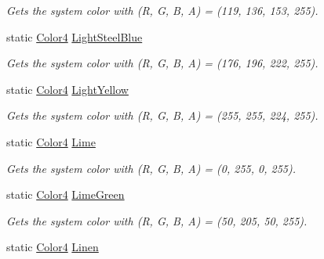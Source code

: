 \begin{DoxyCompactItemize}
\begin{DoxyCompactList}\small\item\em Gets the system color with (R, G, B, A) = (119, 136, 153, 255). \end{DoxyCompactList}\item 
static \hyperlink{struct_open_t_k_1_1_graphics_1_1_color4}{Color4} \hyperlink{struct_open_t_k_1_1_graphics_1_1_color4_a978f25c8c929db4842c6ee03f8fd26cc}{Light\-Steel\-Blue}
\begin{DoxyCompactList}\small\item\em Gets the system color with (R, G, B, A) = (176, 196, 222, 255). \end{DoxyCompactList}\item 
static \hyperlink{struct_open_t_k_1_1_graphics_1_1_color4}{Color4} \hyperlink{struct_open_t_k_1_1_graphics_1_1_color4_a900d25354bc09966822fb83d3f7af327}{Light\-Yellow}
\begin{DoxyCompactList}\small\item\em Gets the system color with (R, G, B, A) = (255, 255, 224, 255). \end{DoxyCompactList}\item 
static \hyperlink{struct_open_t_k_1_1_graphics_1_1_color4}{Color4} \hyperlink{struct_open_t_k_1_1_graphics_1_1_color4_a7fb0b01fe855adff40c03530f20b2219}{Lime}
\begin{DoxyCompactList}\small\item\em Gets the system color with (R, G, B, A) = (0, 255, 0, 255). \end{DoxyCompactList}\item 
static \hyperlink{struct_open_t_k_1_1_graphics_1_1_color4}{Color4} \hyperlink{struct_open_t_k_1_1_graphics_1_1_color4_aacd3eebc4269093bec58799f12449f67}{Lime\-Green}
\begin{DoxyCompactList}\small\item\em Gets the system color with (R, G, B, A) = (50, 205, 50, 255). \end{DoxyCompactList}\item 
static \hyperlink{struct_open_t_k_1_1_graphics_1_1_color4}{Color4} \hyperlink{struct_open_t_k_1_1_graphics_1_1_color4_a3f0c477d7d0344acead8948b4e10861a}{Linen}

\end{DoxyCompactItemize}
